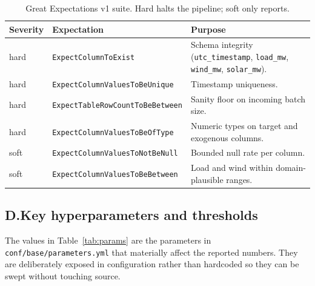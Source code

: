 \documentclass[11pt,a4paper]{article}
\newcommand{\code}[1]{\texttt{\small #1}}
\begin{document}
\begin{table}[H]
\centering
\small
\begin{tabularx}{\linewidth}{@{}l l X@{}}
\toprule
\textbf{Severity} & \textbf{Expectation} & \textbf{Purpose} \\
\midrule
hard     & \code{ExpectColumnToExist}             & Schema integrity (\code{utc\_timestamp}, \code{load\_mw}, \code{wind\_mw}, \code{solar\_mw}). \\
hard     & \code{ExpectColumnValuesToBeUnique}    & Timestamp uniqueness. \\
hard     & \code{ExpectTableRowCountToBeBetween}  & Sanity floor on incoming batch size. \\
hard     & \code{ExpectColumnValuesToBeOfType}    & Numeric types on target and exogenous columns. \\
soft     & \code{ExpectColumnValuesToNotBeNull}   & Bounded null rate per column. \\
soft     & \code{ExpectColumnValuesToBeBetween}   & Load and wind within domain-plausible ranges. \\
\bottomrule
\end{tabularx}
\caption{Great Expectations v1 suite. Hard halts the pipeline; soft only reports.}
\label{tab:ge}
\end{table}

\subsection*{D.\quad Key hyperparameters and thresholds}
\label{app:params}

The values in Table~\ref{tab:params} are the parameters in \code{conf/base/parameters.yml} that materially affect the reported numbers. They are deliberately exposed in configuration rather than hardcoded so they can be swept without touching source.
\end{document}
